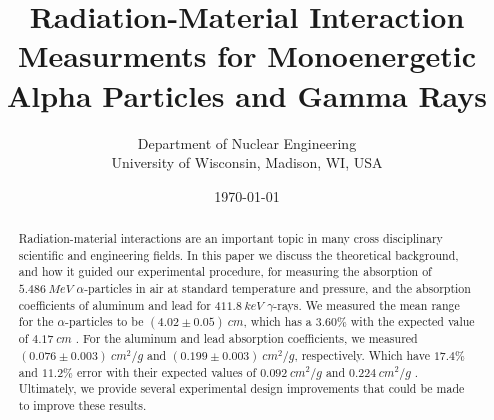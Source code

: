\documentclass[10pt]{article}
\begin{document}
\title{Radiation-Material Interaction Measurments for Monoenergetic Alpha Particles and Gamma Rays}

\author{Department of Nuclear Engineering \\ University of Wisconsin, Madison, WI, USA}
\date{\today}

\maketitle

\begin{abstract}
	Radiation-material interactions are an important topic in many cross disciplinary scientific and engineering fields.  In this paper we discuss the theoretical background, and how it guided our experimental procedure,  for measuring the absorption of $5.486 \ MeV$ $\alpha$-particles in air at standard temperature and pressure, and the absorption coefficients of aluminum and lead for $411.8 \ keV$ $\gamma$-rays.  We measured the mean range for the $\alpha$-particles to be $(4.02 \pm 0.05) \ cm$,  which has a $3.60 \%$ with the expected value of $4.17 \ cm$ \cite{bib:5}.  For the aluminum and lead absorption coefficients, we measured $(0.076 \pm 0.003) \ cm^{2}/g$ and $(0.199 \pm 0.003) \ cm^{2}/g$, respectively.  Which have $17.4 \%$ and $11.2\%$ error with their expected values of $0.092 \ cm^{2}/g$ and $0.224 \ cm^{2}/g$ \cite{bib:4}. Ultimately, we provide several experimental design improvements that could be made to improve these results.
\end{abstract}
\end{document}
